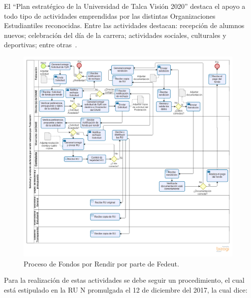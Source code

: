 El ``Plan estratégico de la Universidad de Talca Visión 2020'' destaca el apoyo a todo tipo de actividades emprendidas por las distintas Organizaciones Estudiantiles reconocidas. Entre las actividades destacan: recepción de alumnos nuevos; celebración del día de la carrera; actividades sociales, culturales y deportivas; entre otras~\cite{5}.


\begin{figure}[htbp!]
    \includegraphics[width=\textwidth]{Imagenes/Solicitud_Federacion.png}
    \caption{\label{fig: Solicitud_Federacion}Proceso de Fondos por Rendir por parte de Fedeut.}
\end{figure}

Para la realización de estas actividades se debe seguir un procedimiento, el cual está estipulado en la RU N promulgada el 12 de diciembre del 2017, la cual dice:

